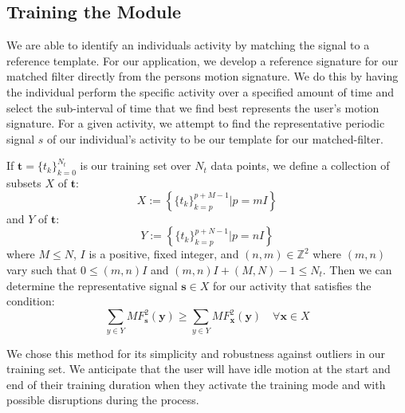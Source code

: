\documentclass[journal]{IEEEtran}
\begin{document}
\subsection{Training the Module}
We are able to identify an individual\textquotesingle s activity by matching the signal to a reference template.
For our application, we develop a reference signature for our matched filter directly from the person\textquotesingle s motion signature.
We do this by having the individual perform the specific activity over a specified amount of time and select the sub-interval of time that we find best represents the user's motion signature.
For a given activity, we attempt to find the representative periodic signal $s$ of our individual’s activity to be our template for our matched-filter.

If $\textbf{t} = \{t_k\}_{k=0}^{N_t}$ is our training set over $N_t$ data points, we define a collection of subsets $X$ of $\textbf{t}$:
%
\begin{equation} \label{X_subsets_of_training_eq}
X := \left \{ \{t_k\}_{k=p}^{p+M-1} | p=mI \right \}
\end{equation}
%
and $Y$ of $\textbf{t}$:
%
\begin{equation} \label{Y_subsets_of_training_eq}
Y := \left \{ \{t_k\}_{k=p}^{p+N-1} | p=nI \right \}
\end{equation}
%
where $M \leq N$, $I$ is a positive, fixed integer, and $(n,m) \in \mathbb{Z}^2$ where $(m,n)$ vary such that $0 \leq (m,n)I$ and $(m,n)I + (M,N) - 1 \leq N_t$. Then we can determine the representative signal $\textbf{s} \in X$ for our activity that satisfies the condition:
%
\begin{equation} \label{s_condition}
\sum_{y \in Y}MF^2_{\textbf{s}}(\textbf{y}) \geq \sum_{y \in Y}MF^2_{\textbf{x}}(\textbf{y}) \quad \forall \textbf{x} \in X
\end{equation}

We chose this method for its simplicity and robustness against outliers in our training set. We anticipate that the user will have idle motion at the start and end of their training duration when they activate the training mode and with possible disruptions during the process.
%
%
\end{document}
